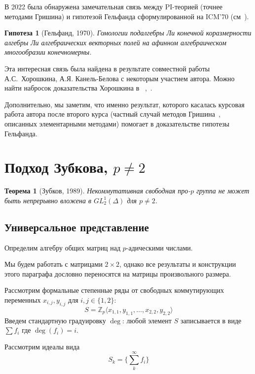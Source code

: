 \documentclass[12pt,a4paper]{article}
\newtheorem{theorem}{Теорема}[section]
\newtheorem{conjecture}{Гипотеза}[section]
\newcommand{\Z}{\ensuremath{\mathbb{Z}}}
\begin{document}
    В 2022 была обнаружена замечательная связь между PI-теорией (точнее методами Гришина) и гипотезой Гельфанда сформулированной на ICM’70 (см\ \cite{Gelfand}).
    \vskip 0.1in\noindent
    \begin{conjecture}[Гельфанд, 1970]
        \label{Gelfand}
        Гомологии подалгебры Ли конечной коразмерности алгебры Ли алгебраических векторных полей на афинном алгебраическом многообразии конечномерны.
    \end{conjecture}
    \vskip 0.1in\noindent
    Эта интересная связь была найдена в результате совместной работы А.С.\ Хорошкина, А.Я. Канель-Белова с некоторым участием автора.
    Можно найти набросок доказательства Хорошкина в ~\cite{Feigin-Kanel-Khoroshkin},~\cite{Centrone-Kanel-Khoroshkin-Vorobiov}.

    Дополнительно, мы заметим, что именно результат, которого касалась курсовая работа автора после второго курса (частный случай методов Гришина\ \cite{Grishin}, описанных элементарными методами) помогает в доказательстве гипотезы Гельфанда.


    \section{Подход Зубкова, $p\neq2$}
    \begin{theorem}[Зубков, 1989]
        \label{thm:Zubkov-main}
        Некоммутативная свободная про-$p$ группа не может быть непрерывно вложена в $GL^1_2(\Delta)$ для $p\neq 2$.
    \end{theorem}

    \subsection{Универсальное представление}
    Определим алгебру общих матриц над $p$-адическими числами.

    Мы будем работать с матрицами $2\times2$, однако все результаты и конструкции этого параграфа дословно переносятся на матрицы произвольного размера.

    Рассмотрим формальные степенные ряды от свободных коммутирующих переменных $x_{i,j}, y_{i,j}$ для $i,j \in \{ 1, 2 \}$:
    \[
        S = \Z_{p}\langle x_{1,1}, y_{1,1}, \ldots, x_{2,2}, y_{2,2} \rangle
    \]
    Введем стандартную градуировку $\deg$: любой элемент $S$ записывается в виде $\sum f_i$ где $\deg{(f_i)} = i$.

    Рассмотрим идеалы вида
    \[
        S_k = \{\sum\limits_k^{\infty} f_i \}
    \]
\end{document}
